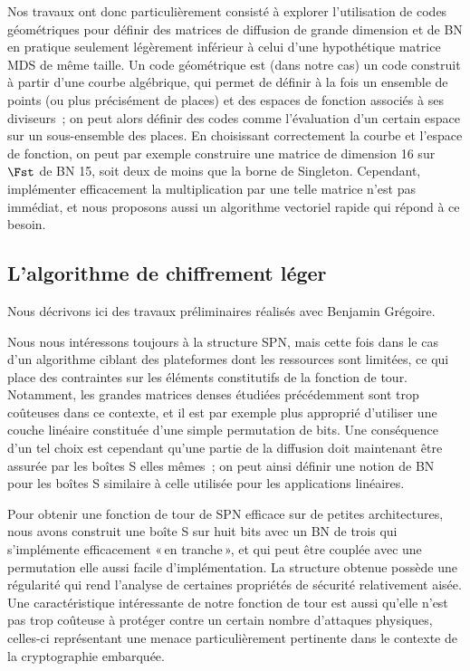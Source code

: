 Nos travaux ont donc particulièrement consisté à explorer l'utilisation de codes géométriques pour définir des matrices de diffusion
de grande dimension et de BN en pratique seulement légèrement inférieur à celui d'une hypothétique matrice MDS de même taille.
Un code géométrique est (dans notre cas) un code construit à partir d'une courbe algébrique, qui permet de définir à la fois un ensemble
de points (ou plus précisément de places) et des espaces de fonction associés à ses diviseurs~; on peut alors définir des codes
comme l'évaluation d'un certain espace sur un sous-ensemble des places.
En choisissant correctement la courbe et l'espace de fonction, on peut par exemple construire une matrice de dimension 16 sur
$\Fst$ de BN 15, soit deux de moins que la borne de Singleton. Cependant, implémenter efficacement la multiplication par une telle
matrice n'est pas immédiat, et nous proposons aussi un algorithme vectoriel rapide qui répond à ce besoin.

\subsection{L'algorithme de chiffrement léger \fly \cite{fly}}

Nous décrivons ici des travaux préliminaires réalisés avec Benjamin Grégoire.

\medskip

Nous nous intéressons toujours à la structure SPN, mais cette fois dans le cas d'un algorithme ciblant des plateformes dont les ressources
sont limitées, ce qui place des contraintes sur les éléments constitutifs de la fonction de tour. Notamment, les grandes matrices
denses étudiées précédemment sont trop coûteuses dans ce contexte, et il est par exemple plus approprié d'utiliser une couche linéaire
constituée d'une simple permutation de bits. Une conséquence d'un tel choix est cependant qu'une partie de la diffusion doit maintenant
être assurée par les boîtes S elles mêmes~; on peut ainsi définir une notion de BN pour les boîtes S similaire à celle utilisée pour
les applications linéaires.

Pour obtenir une fonction de tour de SPN efficace sur de petites architectures, nous avons construit une boîte S sur huit bits avec
un BN de trois qui s'implémente efficacement «\,en tranche\,», et qui peut être couplée avec une permutation elle aussi facile
d'implémentation. La structure obtenue possède une régularité qui rend l'analyse de certaines propriétés de sécurité
relativement aisée. Une caractéristique intéressante de notre fonction de tour est aussi qu'elle n'est pas trop coûteuse à protéger
contre un certain nombre d'attaques physiques, celles-ci représentant une menace particulièrement pertinente dans le contexte
de la cryptographie embarquée.

